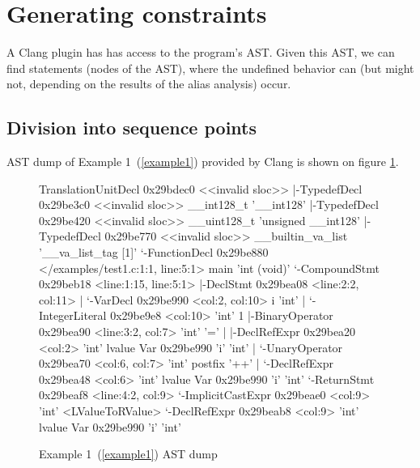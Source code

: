 \section{Generating constraints}
A Clang plugin has has access to the program's AST. Given this AST, we can find statements (nodes of the AST), where the undefined behavior can (but might not, depending on the results of the alias analysis) occur.
\subsection{Division into sequence points}
AST dump of Example 1~(\ref{example1}) provided by Clang is shown on figure \ref{ASTdump}.
\begin{figure}
\caption{Example 1~(\ref{example1}) AST dump}
\label{ASTdump}
\begin{code}
TranslationUnitDecl 0x29bdec0 <<invalid sloc>>
|-TypedefDecl 0x29be3c0 <<invalid sloc>> __int128_t '__int128'
|-TypedefDecl 0x29be420 <<invalid sloc>> __uint128_t 'unsigned __int128'
|-TypedefDecl 0x29be770 <<invalid sloc>> __builtin_va_list '__va_list_tag [1]'
`-FunctionDecl 0x29be880 </examples/test1.c:1:1, line:5:1> main 'int (void)'
  `-CompoundStmt 0x29beb18 <line:1:15, line:5:1>
    |-DeclStmt 0x29bea08 <line:2:2, col:11>
    | `-VarDecl 0x29be990 <col:2, col:10> i 'int'
    |   `-IntegerLiteral 0x29be9e8 <col:10> 'int' 1
    |-BinaryOperator 0x29bea90 <line:3:2, col:7> 'int' '='
    | |-DeclRefExpr 0x29bea20 <col:2> 'int' lvalue Var 0x29be990 'i' 'int'
    | `-UnaryOperator 0x29bea70 <col:6, col:7> 'int' postfix '++'
    |   `-DeclRefExpr 0x29bea48 <col:6> 'int' lvalue Var 0x29be990 'i' 'int'
    `-ReturnStmt 0x29beaf8 <line:4:2, col:9>
      `-ImplicitCastExpr 0x29beae0 <col:9> 'int' <LValueToRValue>
        `-DeclRefExpr 0x29beab8 <col:9> 'int' lvalue Var 0x29be990 'i' 'int'
\end{code}
\end{figure}

